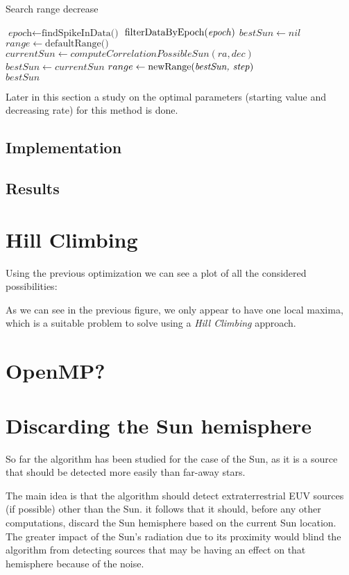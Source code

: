 \begin{algorithm}
	\caption{Search range decrease}\label{searchRangeDecrease}
	\begin{algorithmic}[1]
		\State $\textit{epoch} \gets \text{findSpikeInData()}$ 
		\State $\text{filterDataByEpoch(\textit{epoch})}$
		\State $bestSun \gets nil$
		\State $range \gets \text{defaultRange()}$ 
		\State $currentSun \gets computeCorrelationPossibleSun(ra, dec)$
		\State $bestSun \gets currentSun$
		\State $range \gets \text{newRange(\textit{bestSun, step})}$ 
		\EndIf
		\EndFor
		\EndFor
		\EndFor
		\\
		\Return $bestSun$
		\EndProcedure
	\end{algorithmic}
\end{algorithm}

Later in this section a study on the optimal parameters (starting value and decreasing rate) for this method is done. 

\subsection{Implementation}

\subsection{Results}

\section{Hill Climbing}

Using the previous optimization we can see a plot of all the considered possibilities:

As we can see in the previous figure, we only appear to have one local maxima, which is a suitable problem to solve using a \textit{Hill Climbing} approach.

\section{OpenMP?}


\section{Discarding the Sun hemisphere}

So far the algorithm has been studied for the case of the Sun, as it is a source that should be detected more easily than far-away stars. 

The main idea is that the algorithm should detect extraterrestrial EUV sources (if possible) other than the Sun. it follows that it should, before any other computations, discard the Sun hemisphere based on the current Sun location. The greater impact of the Sun's radiation due to its proximity would blind the algorithm from detecting sources that may be having an effect on that hemisphere because of the noise.